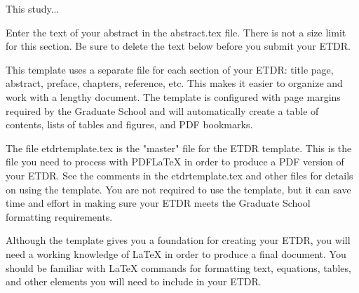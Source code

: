 
\pagestyle{empty}
\setlength{\baselineskip}{0.8cm}



This study...  

Enter the text of your abstract in the abstract.tex file. There is not a size limit for this section. Be sure to delete the text below before you submit your ETDR.

This template uses a separate file for each section of your ETDR:  title page, abstract, preface, chapters, reference, etc.  This makes it easier to organize and work with a lengthy document.  The template is configured with page margins required by the Graduate School and will automatically create a table of contents, lists of tables and figures, and PDF bookmarks.

The file etdrtemplate.tex is the "master" file for the ETDR template.  This is the file you need to process with PDFLaTeX in order to produce a PDF version of your ETDR.  See the comments in the etdrtemplate.tex and other files for details on using the template.  You are not required to use the template, but it can save time and effort in making sure your ETDR meets the Graduate School formatting requirements.

Although the template gives you a foundation for creating your ETDR, you will need a working knowledge of LaTeX in order to produce a final document.  You should be familiar with LaTeX commands for formatting text, equations, tables, and other elements you will need to include in your ETDR.
